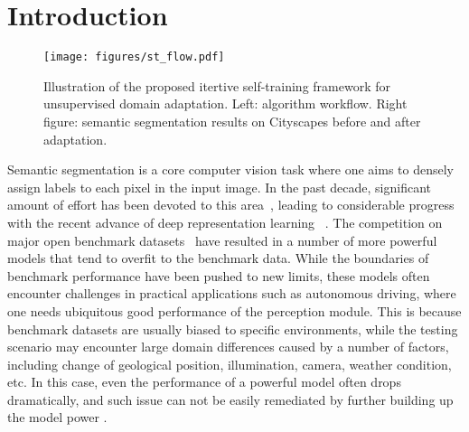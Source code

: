 \documentclass[runningheads]{llncs}
\begin{document}
\section{Introduction}\label{introduction}
\begin{figure}[!t]
 \centering
{}
  \texttt{[image: figures/st\_flow.pdf]}
  \caption{Illustration of the proposed itertive self-training framework for unsupervised domain adaptation. Left: algorithm workflow. Right figure: semantic segmentation results on Cityscapes before and after adaptation.}
  \label{flow}
\end{figure}

Semantic segmentation is a core computer vision task where one aims to densely assign labels to each pixel in the input image. In the past decade, significant amount of effort has been devoted to this area~\cite{cordts2016cityscapes,geiger2012we,zhou2016semantic,Chen_2017_ICCV,nexar,long2015fully,Zhao_2017_CVPR,wu2016wider,chen2018deeplab,chen2017rethinking,wang2017understanding}, leading to considerable progress with the recent advance of deep representation learning ~\cite{krizhevsky2012imagenet, Simonyan15, he2016deep}. The competition on major open benchmark datasets~\cite{cordts2016cityscapes} have resulted in a number of more powerful models that tend to overfit to the benchmark data. While the boundaries of benchmark performance have been pushed to new limits, these models often encounter challenges in practical applications such as autonomous driving, where one needs ubiquitous good performance of the perception module. This is because benchmark datasets are usually biased to specific environments, while the testing scenario may encounter large domain differences caused by a number of factors, including change of geological position, illumination, camera, weather condition, etc. In this case, even the performance of a powerful model often drops dramatically, and such issue can not be easily remediated by further building up the model power \cite{Chen_2017_ICCV,hoffman2016fcns,hoffman2018cycada}.
\end{document}
